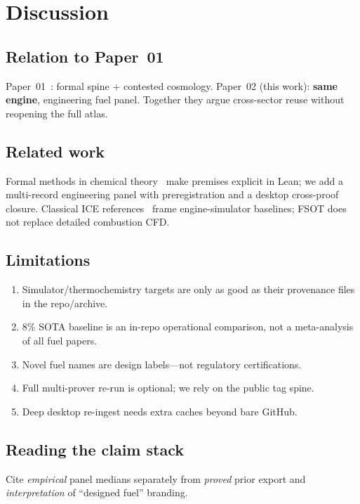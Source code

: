 \documentclass[11pt,a4paper]{article}
\begin{document}
\section{Discussion}
\label{sec:disc}

\subsection{Relation to Paper~01}

Paper~01~\cite{FSOTPaper01}: formal spine + contested cosmology.
Paper~02 (this work): \textbf{same engine}, engineering fuel panel.
Together they argue cross-sector reuse without reopening the full atlas.

\subsection{Related work}

Formal methods in chemical theory~\cite{Bobbin2024} make premises explicit in
Lean; we add a multi-record engineering panel with preregistration and a
desktop cross-proof closure.
Classical ICE references~\cite{HeywoodICE} frame engine-simulator baselines;
FSOT does not replace detailed combustion CFD.

\subsection{Limitations}

\begin{enumerate}[leftmargin=*]
\item Simulator/thermochemistry targets are only as good as their provenance
      files in the repo/archive.
\item $8\%$ SOTA baseline is an in-repo operational comparison, not a
      meta-analysis of all fuel papers.
\item Novel fuel names are design labels---not regulatory certifications.
\item Full multi-prover re-run is optional; we rely on the public tag spine.
\item Deep desktop re-ingest needs extra caches beyond bare GitHub.
\end{enumerate}

\subsection{Reading the claim stack}

Cite \emph{empirical} panel medians separately from \emph{proved} prior export
and \emph{interpretation} of ``designed fuel'' branding.
\end{document}
